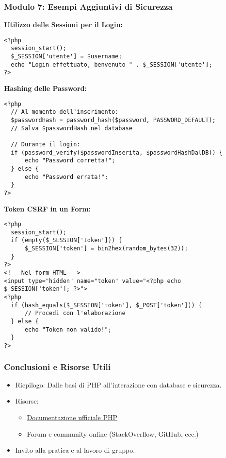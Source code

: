 \documentclass{beamer}
\begin{document}
\begin{frame}[fragile]
\frametitle{Modulo 7: Esempi Aggiuntivi di Sicurezza}
\textbf{Utilizzo delle Sessioni per il Login:}
\begin{lstlisting}
<?php
  session_start();
  $_SESSION['utente'] = $username;
  echo "Login effettuato, benvenuto " . $_SESSION['utente'];
?>
\end{lstlisting}
\vspace{0.5em}
\textbf{Hashing delle Password:}
\begin{lstlisting}
<?php
  // Al momento dell'inserimento:
  $passwordHash = password_hash($password, PASSWORD_DEFAULT);
  // Salva $passwordHash nel database

  // Durante il login:
  if (password_verify($passwordInserita, $passwordHashDalDB)) {
      echo "Password corretta!";
  } else {
      echo "Password errata!";
  }
?>
\end{lstlisting}
\vspace{0.5em}
\textbf{Token CSRF in un Form:}
\begin{lstlisting}
<?php
  session_start();
  if (empty($_SESSION['token'])) {
      $_SESSION['token'] = bin2hex(random_bytes(32));
  }
?>
<!-- Nel form HTML -->
<input type="hidden" name="token" value="<?php echo $_SESSION['token']; ?>">
<?php
  if (hash_equals($_SESSION['token'], $_POST['token'])) {
      // Procedi con l'elaborazione
  } else {
      echo "Token non valido!";
  }
?>
\end{lstlisting}
\end{frame}


\begin{frame}
\frametitle{Conclusioni e Risorse Utili}
\begin{itemize}
    \item Riepilogo: Dalle basi di PHP all'interazione con database e sicurezza.
    \item Risorse:
    \begin{itemize}
        \item \href{https://www.php.net/manual/it/}{Documentazione ufficiale PHP}
        \item Forum e community online (StackOverflow, GitHub, ecc.)
    \end{itemize}
    \item Invito alla pratica e al lavoro di gruppo.
\end{itemize}
\end{frame}
\end{document}

